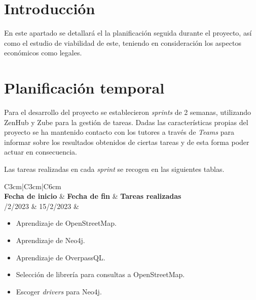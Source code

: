 
\section{Introducción}
En este apartado se detallará el la planificación seguida durante el proyecto, así como el estudio de viabilidad de este, teniendo en consideración los aspectos económicos como legales.
\section{Planificación temporal}

Para el desarrollo del proyecto se establecieron \textit{sprints} de 2 semanas, utilizando ZenHub y Zube para la gestión de tareas. Dadas las características propias del proyecto se ha mantenido contacto con los tutores a través de \textit{Teams} para informar sobre los resultados obtenidos de ciertas tareas y de esta forma poder actuar en consecuencia.

Las tareas realizadas en cada \textit{sprint} se recogen en las siguientes tablas.




\begin{table}[h!]
	\centering
	\begin{tabular}{C{3cm}|C{3cm}|C{6cm}} 
			\\
			\midrule
			\textbf{Fecha de inicio} & \textbf{Fecha de fin} & \textbf{Tareas realizadas}\\
			/2/2023 & 15/2/2023 & \begin{itemize}[left=0pt]
					\item Aprendizaje de OpenStreetMap.
					\item Aprendizaje de Neo4j.
					\item Aprendizaje de OverpassQL.
					\item Selección de librería para consultas a OpenStreetMap.
					\item Escoger \textit{drivers} para Neo4j.
				\end{itemize}\tabularnewline
			\bottomrule
		\end{tabular}
	\caption{Tabla del \textit{sprint} 1}
	\label{tabsprint1}
\end{table}

